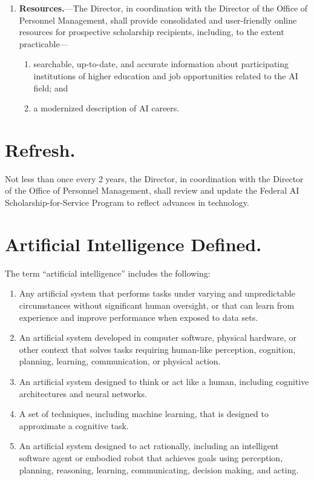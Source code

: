 \documentclass{article}
\renewcommand{\thesection}{(\alph{section})} %
\begin{document}
\begin{enumerate}
            \item {\bf Resources.}---The Director, in coordination with the 
        Director of the Office of Personnel Management, shall provide 
        consolidated and user-friendly online resources for prospective 
        scholarship recipients, including, to the extent practicable---
\begin{enumerate}
                    \item searchable, up-to-date, and accurate 
                information about participating institutions of higher 
                education and job opportunities related to the AI 
                field; and
                    \item a modernized description of AI careers.
\end{enumerate}
\end{enumerate}
    \section{Refresh.}Not less than once every 2 years, the Director, in 
coordination with the Director of the Office of Personnel Management, 
shall review and update the Federal AI Scholarship-for-Service Program 
to reflect advances in technology.

\appendix

\renewcommand{\thesection}{\Roman{section}}

    \section{Artificial Intelligence Defined.}The term \label{appendix:ai}
``artificial intelligence'' includes the following:
\begin{enumerate}
            \item Any artificial system that performs tasks under varying 
        and unpredictable circumstances without significant human 
        oversight, or that can learn from experience and improve 
        performance when exposed to data sets.
            \item An artificial system developed in computer software, 
        physical hardware, or other context that solves tasks requiring
        human-like perception, cognition, planning, learning, 
        communication, or physical action.
            \item An artificial system designed to think or act like a 
        human, including cognitive architectures and neural networks.
            \item A set of techniques, including machine learning, that is 
        designed to approximate a cognitive task.
            \item An artificial system designed to act rationally, 
        including an intelligent software agent or embodied robot that 
        achieves goals using perception, planning, reasoning, learning, 
        communicating, decision making, and acting.
\end{enumerate}
\end{document}

